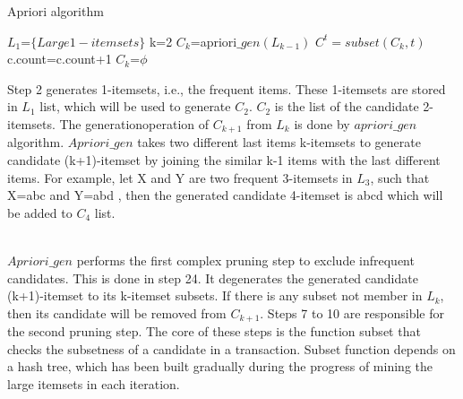 \documentclass{article}\usepackage[]{graphicx}\usepackage[]{color}
\begin{document}
\begin{algorithm}
\caption{Apriori algorithm}
\label{CHalgorithm}
\begin{algorithmic}[1]
\State $L_1$=$\{Large 1- itemsets\}$
\State k=2
\State $C_k$=apriori$\_gen(L_{k-1})$ 
\State $C^t=subset(C_k,t)$
\State c.count=c.count+1
\EndFor
\EndFor
\EndWhile  
{}
\EndProcedure
{}
\State $C_k$=$\phi$
\EndIf
{}
\EndFor
{}
\EndProcedure
\end{algorithmic}
\end{algorithm}
\hspace{0.5cm} Step 2 generates 1-itemsets, i.e., the frequent items. These 1-itemsets are stored in $L_1$ list, which will be used to generate $C_2$. $C_2$ is the list of the candidate 2-itemsets. The generationoperation of $C_{k+1}$ from $L_k$ is done by $apriori\_gen$ algorithm. $Apriori\_gen$ takes two different last items k-itemsets to generate candidate (k+1)-itemset by joining the similar k-1 items with the last
different items. For example, let X and Y are two frequent 3-itemsets in $L_3$, such that X=abc and Y=abd
, then the generated candidate 4-itemset is abcd which will be added to $C_4$ list.\par\\
\hspace{0.5cm}$Apriori\_gen$ performs the first complex pruning step to exclude infrequent candidates. This is done in step 24. It degenerates the generated candidate (k+1)-itemset to its k-itemset subsets. If there is any subset not member in $L_k$, then its candidate will be removed from $C_{k+1}$. Steps 7 to 10 are responsible for the second pruning step. The core of these steps is the function subset that checks the subsetness of a candidate in a transaction. Subset function depends on a hash tree, which has been built gradually during the progress of mining the large itemsets in each iteration.\par\\
\end{document}
